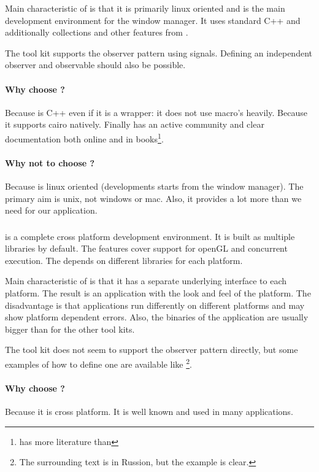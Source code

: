 Main characteristic of  is that it is primarily linux oriented and
is the main development environment for the  window manager. It uses 
standard C++ and additionally collections and other features from .

The tool kit  supports the observer pattern using signals. Defining
an independent observer and observable should also be possible.

\paragraph{Why choose ?} Because  is C++ even if it is
a wrapper: it does not use macro's heavily. Because it supports cairo natively. 
Finally  has an active community and clear documentation both online and
in books\footnote{ has more literature than }.

\paragraph{Why not to choose ?} Because  is linux oriented (developments 
starts from the  window manager). The primary aim is unix, not windows or mac. 
Also, it provides a lot more than we need for our application.

\subsubsection{}
 is a complete cross platform development environment. It is built 
as multiple libraries by default. The features cover support for openGL and 
concurrent execution. The  depends on different libraries for each 
platform.

Main characteristic of  is that it has a separate underlying interface
to each platform. The result is an application with the look and feel of the
platform. The disadvantage is that applications run differently on different platforms 
and may show platform dependent errors. Also, the binaries of the application are
usually bigger than for the other tool kits.

The tool kit  does not seem to support the observer pattern directly, but
some examples of how to define one are available like \cite{wxwidget:observer-example}\footnote{The 
surrounding text is in Russion, but the example is clear.}.

\paragraph{Why choose ?} Because it is cross platform. It is well known and used
in many applications.
 
